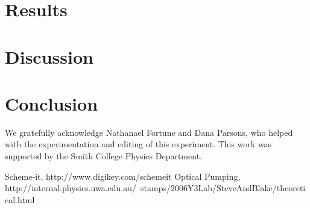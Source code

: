 \documentclass[prb,preprint]{revtex4-1}
\begin{document}
\section{Results}



\section{Discussion}

\section{Conclusion}


\begin{acknowledgments}

We gratefully acknowledge Nathanael Fortune and Dana Parsons, who helped with the experimentation and editing of this experiment.  This work was supported by the Smith College Physics Department.

\end{acknowledgments}


\begin{thebibliography}{99}

 Scheme-it, http://www.digikey.com/schemeit
 Optical Pumping, http://internal.physics.uwa.edu.au/~stamps/2006Y3Lab/SteveAndBlake/theoretical.html

\end{thebibliography}

\end{document}
